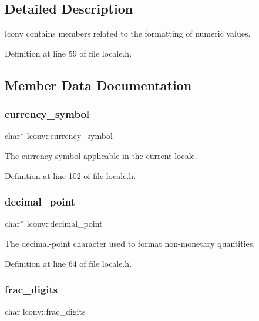 \subsection{Detailed Description}
lconv contains members related to the formatting of numeric values. 

Definition at line 59 of file locale.\+h.



\subsection{Member Data Documentation}
\mbox{\label{structlconv_af3657bb8bf2a83a868cdeb0b108ab921}} 
\subsubsection{\texorpdfstring{currency\_symbol}{currency\_symbol}}
{\footnotesize\ttfamily char$\ast$ lconv\+::currency\+\_\+symbol}



The currency symbol applicable in the current locale. 



Definition at line 102 of file locale.\+h.

\mbox{\label{structlconv_a445e27fc7f797c8cca97b381f062fb60}} 
\subsubsection{\texorpdfstring{decimal\_point}{decimal\_point}}
{\footnotesize\ttfamily char$\ast$ lconv\+::decimal\+\_\+point}



The decimal-\/point character used to format non-\/monetary quantities. 



Definition at line 64 of file locale.\+h.

\mbox{\label{structlconv_aa16e32ff4dcc95445742b5b165ffb071}} 
\subsubsection{\texorpdfstring{frac\_digits}{frac\_digits}}
{\footnotesize\ttfamily char lconv\+::frac\+\_\+digits}



